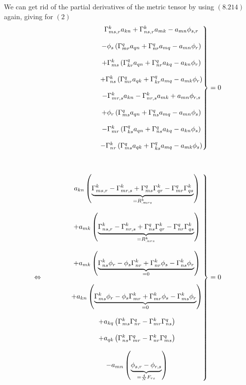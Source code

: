 We can get rid of the partial derivatives of the metric tensor by using $\mathbf{(8.214)}$ again, giving for $(2)$
\begin{align*}
\left.\begin{matrix}
\Gamma^k_{ms,r}a_{kn} + \Gamma^k_{ns,r}a_{mk} - a_{mn}\phi_{s,r}\\\\- \phi_{s}\left(\Gamma^q_{mr}a_{qn} + \Gamma^q_{nr}a_{mq} - a_{mn}\phi_{r}\right)\\\\
+\Gamma^k_{ms}\left(\Gamma^q_{kr}a_{qn} + \Gamma^q_{nr}a_{kq} - a_{kn}\phi_{r}\right) \\\\
+ \Gamma^k_{ns}\left(\Gamma^q_{mr}a_{qk} + \Gamma^q_{kr}a_{mq} - a_{mk}\phi_{r}\right) \\\\
-\Gamma^k_{mr,s}a_{kn} - \Gamma^k_{nr,s}a_{mk} + a_{mn}\phi_{r,s}\\\\
+ \phi_{r}\left(\Gamma^q_{ms}a_{qn} + \Gamma^q_{ns}a_{mq} - a_{mn}\phi_{s}\right)\\\\
-\Gamma^k_{mr}\left(\Gamma^q_{ks}a_{qn} + \Gamma^q_{ns}a_{kq} - a_{kn}\phi_{s}\right)\\\\
- \Gamma^k_{nr}\left(\Gamma^q_{ms}a_{qk} + \Gamma^q_{ks}a_{mq} - a_{mk}\phi_{s}\right)
\end{matrix}\right\}&=0\\\\\\
\Leftrightarrow \quad\quad\quad\quad\left.\begin{matrix}
a_{kn}\left(\underbrace{\Gamma^k_{ms,r}-\Gamma^k_{mr,s} +\Gamma^q_{ms}\Gamma^k_{qr}-\Gamma^q_{mr}\Gamma^k_{qs}}_{=R^k_{.mrs}}\right)\\\\
+ a_{mk}\left(\underbrace{\Gamma^k_{ns,r} - \Gamma^k_{nr,s}+\Gamma^q_{ns} \Gamma^k_{qr} - \Gamma^q_{nr} \Gamma^k_{qs} }_{=R^k_{.nrs}}\right)\\\\
 +a_{mk}\left(\underbrace{\Gamma^k_{ns}\phi_{r} - \phi_{s} \Gamma^k_{nr}+ \Gamma^k_{nr} \phi_{s}- \Gamma^k_{ns}\phi_{r}}_{=0}\right) \\\\
+a_{kn}\left(\underbrace{\Gamma^k_{ms}\phi_{r}- \phi_{s}\Gamma^k_{mr}+\Gamma^k_{mr} \phi_{s}- \Gamma^k_{ms}\phi_{r}}_{=0}\right) \\\\
+ a_{kq}\left(\Gamma^k_{ms}\Gamma^q_{nr}  -\Gamma^k_{mr} \Gamma^q_{ns}\right) \\\\
+ a_{qk}\left(\Gamma^k_{ns}\Gamma^q_{mr}- \Gamma^k_{nr}\Gamma^q_{ms}\right) \\\\
-a_{mn}\left(\underbrace{ \phi_{s,r}-\phi_{r,s}}_{=\frac{4}{N}F_{rs} }\right)
\end{matrix}\right\}&=0\\
\end{align*} 
